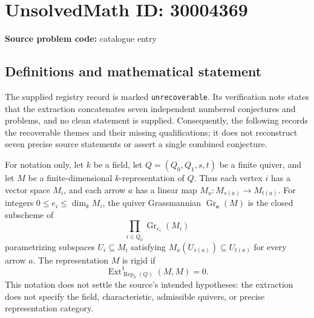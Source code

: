 \documentclass[11pt]{article}
\begin{document}
\section*{UnsolvedMath ID: 30004369}
\textbf{Source problem code:} catalogue entry
\subsection{Definitions and mathematical statement}
The supplied registry record is marked \texttt{unrecoverable}. Its verification note states that the extraction concatenates seven independent numbered conjectures and problems, and no clean statement is supplied. Consequently, the following records the recoverable themes and their missing qualifications; it does not reconstruct seven precise source statements or assert a single combined conjecture.

For notation only, let \(k\) be a field, let \(Q=(Q_0,Q_1,s,t)\) be a finite quiver, and let \(M\) be a finite-dimensional \(k\)-representation of \(Q\). Thus each vertex \(i\) has a vector space \(M_i\), and each arrow \(a\) has a linear map \(M_a:M_{s(a)}\to M_{t(a)}\). For integers \(0\leq e_i\leq\dim_k M_i\), the quiver Grassmannian \(\operatorname{Gr}_{\mathbf e}(M)\) is the closed subscheme of
\[
\prod_{i\in Q_0}\operatorname{Gr}_{e_i}(M_i)
\]
parametrizing subspaces \(U_i\subseteq M_i\) satisfying \(M_a(U_{s(a)})\subseteq U_{t(a)}\) for every arrow \(a\). The representation \(M\) is rigid if
\[
\operatorname{Ext}^{1}_{\operatorname{Rep}_k(Q)}(M,M)=0.
\]
This notation does not settle the source's intended hypotheses: the extraction does not specify the field, characteristic, admissible quivers, or precise representation category.
\end{document}
